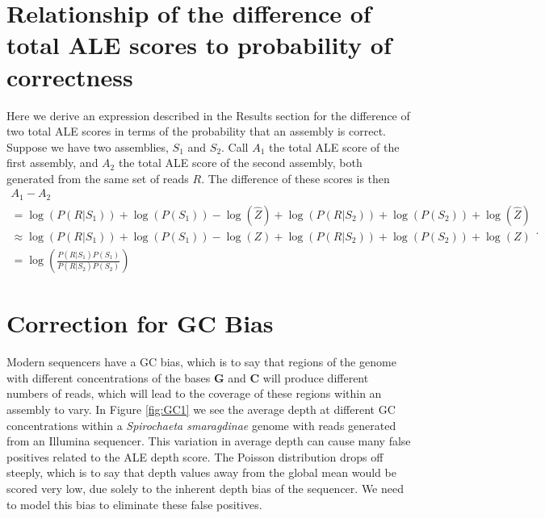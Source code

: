 \documentclass[phd,tocprelim]{cornell}
\begin{document}

\section{Relationship of the difference of total ALE scores to probability of correctness} %
\label{sec:Relationship of the difference of total ALE scores to probability of correctness}

Here we derive an expression described in the Results section for the difference of two total ALE scores in terms of the probability that an assembly is correct.  Suppose we have two assemblies, $S_{1}$ and $S_{2}$.  Call $A_{1}$ the total ALE score of the first assembly, and $A_{2}$ the total ALE score of the second assembly, both generated from the same set of reads $R$. The difference of these scores is then
\begin{equation}
    \begin{array}{l}
        A_{1} - A_{2} \\
        = \log\left(P\left(R|S_{1}\right)\right) + \log\left(P\left(S_{1}\right)\right) - \log\left(\hat{Z}\right) + \log\left(P\left(R|S_{2}\right)\right) + \log\left(P\left(S_{2}\right)\right) + \log\left(\hat{Z}\right) \\
        \approx \log\left(P\left(R|S_{1}\right)\right) + \log\left(P\left(S_{1}\right)\right) - \log\left(Z\right) + \log\left(P\left(R|S_{2}\right)\right) + \log\left(P\left(S_{2}\right)\right) + \log\left(Z\right) \\
        = \log\left(\frac{P\left(R|S_{1}\right)P\left(S_{1}\right)}{P\left(R|S_{2}\right)P\left(S_{2}\right)}\right)
    \end{array}.
\end{equation}


\section{Correction for GC Bias} %
\label{sec:GCBias}

Modern sequencers have a GC bias, which is to say that regions of the genome with different concentrations of the bases {\bf G} and {\bf C} will produce different numbers of reads, which will lead to the coverage of these regions within an assembly to vary. In Figure \ref{fig:GC1} we see the average depth at different GC concentrations within a {\it Spirochaeta smaragdinae} genome with reads generated from an Illumina sequencer. This variation in average depth can cause many false positives related to the ALE depth score. The Poisson distribution drops off steeply, which is to say that depth values away from the global mean would be scored very low, due solely to the inherent depth bias of the sequencer. We need to model this bias to eliminate these false positives.
\end{document}
